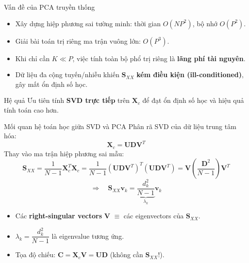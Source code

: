 \begin{frame}{Vấn đề của PCA truyền thống}
	\small
	\begin{itemize}
		\item Xây dựng hiệp phương sai tường minh: thời gian $O(NP^2)$, bộ nhớ $O(P^2)$.
		\item Giải bài toán trị riêng ma trận vuông lớn: $O(P^3)$.
		\item Khi chỉ cần $K\ll P$, việc tính toàn bộ phổ trị riêng là \textbf{lãng phí tài nguyên}.
		\item Dữ liệu đa cộng tuyến/nhiễu khiến $\mathbf{S}_{XX}$ \textbf{kém điều kiện (ill-conditioned)}, gây mất ổn định số học.
	\end{itemize}

	\begin{block}{Hệ quả}
		Ưu tiên tính \textbf{SVD trực tiếp} trên $\mathbf{X}_c$ để đạt ổn định số học và hiệu quả tính toán cao hơn.
	\end{block}
\end{frame}

\begin{frame}{Mối quan hệ toán học giữa SVD và PCA}
	\footnotesize
	Phân rã SVD của dữ liệu trung tâm hóa:
	\[
		\mathbf{X}_c=\mathbf{U}\mathbf{D}\mathbf{V}^T
	\]
	Thay vào ma trận hiệp phương sai mẫu:
	\[
		\mathbf{S}_{XX}=\frac{1}{N-1}\mathbf{X}_c^T\mathbf{X}_c
		=\frac{1}{N-1}({\mathbf{U}\mathbf{D}\mathbf{V}^T})^T({\mathbf{U}\mathbf{D}\mathbf{V}^T})
		=\mathbf{V}\!\left(\frac{\mathbf{D}^2}{N-1}\right)\!\mathbf{V}^T
	\]
	\[
		\Rightarrow\quad\mathbf{S}_{XX}\mathbf{v}_k=\underbrace{\frac{d_k^2}{N-1}}_{\lambda_k}\mathbf{v}_k
	\]
		\begin{itemize}
			\item Các \textbf{right-singular vectors} $\mathbf{V}$ $\equiv$ các eigenvectors của $\mathbf{S}_{XX}$.
			\item $\lambda_k=\dfrac{d_k^2}{N-1}$ là eigenvalue tương ứng.
			\item Tọa độ chiếu: $\mathbf{C}=\mathbf{X}_c\mathbf{V}=\mathbf{U}\mathbf{D}$ (không cần $\mathbf{S}_{XX}$!).
		\end{itemize}
\end{frame}

